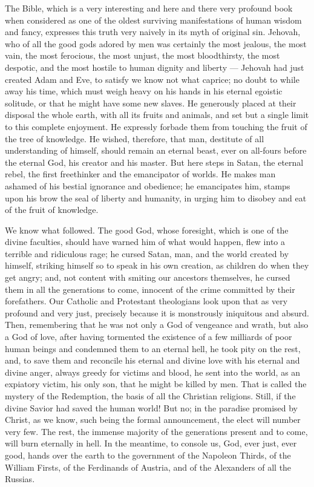 \documentclass[12pt]{report}
\begin{document}
The Bible, which is a very interesting and here and there very profound book when considered as one of the oldest surviving manifestations of human wisdom and fancy, expresses this truth very naively in its myth of original sin. Jehovah, who of all the good gods adored by men was certainly the most jealous, the most vain, the most ferocious, the most unjust, the most bloodthirsty, the most despotic, and the most hostile to human dignity and liberty — Jehovah had just created Adam and Eve, to satisfy we know not what caprice; no doubt to while away his time, which must weigh heavy on his hands in his eternal egoistic solitude, or that he might have some new slaves. He generously placed at their disposal the whole earth, with all its fruits and animals, and set but a single limit to this complete enjoyment. He expressly forbade them from touching the fruit of the tree of knowledge. He wished, therefore, that man, destitute of all understanding of himself, should remain an eternal beast, ever on all-fours before the eternal God, his creator and his master. But here steps in Satan, the eternal rebel, the first freethinker and the emancipator of worlds. He makes man ashamed of his bestial ignorance and obedience; he emancipates him, stamps upon his brow the seal of liberty and humanity, in urging him to disobey and eat of the fruit of knowledge.


We know what followed. The good God, whose foresight, which is one of the divine faculties, should have warned him of what would happen, flew into a terrible and ridiculous rage; he cursed Satan, man, and the world created by himself, striking himself so to speak in his own creation, as children do when they get angry; and, not content with smiting our ancestors themselves, he cursed them in all the generations to come, innocent of the crime committed by their forefathers. Our Catholic and Protestant theologians look upon that as very profound and very just, precisely because it is monstrously iniquitous and absurd. Then, remembering that he was not only a God of vengeance and wrath, but also a God of love, after having tormented the existence of a few milliards of poor human beings and condemned them to an eternal hell, he took pity on the rest, and, to save them and reconcile his eternal and divine love with his eternal and divine anger, always greedy for victims and blood, he sent into the world, as an expiatory victim, his only son, that he might be killed by men. That is called the mystery of the Redemption, the basis of all the Christian religions. Still, if the divine Savior had saved the human world! But no; in the paradise promised by Christ, as we know, such being the formal announcement, the elect will number very few. The rest, the immense majority of the generations present and to come, will burn eternally in hell. In the meantime, to console us, God, ever just, ever good, hands over the earth to the government of the Napoleon Thirds, of the William Firsts, of the Ferdinands of Austria, and of the Alexanders of all the Russias.
\end{document}
